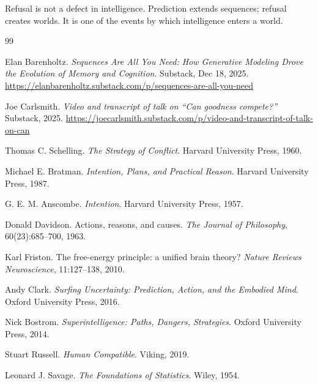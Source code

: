 \documentclass[11pt]{article}
\begin{document}
Refusal is not a defect in intelligence. Prediction extends sequences; refusal
creates worlds. It is one of the events by which intelligence enters a world.


\newpage
\begin{thebibliography}{99}

Elan Barenholtz.
\newblock \emph{Sequences Are All You Need: How Generative Modeling Drove the
Evolution of Memory and Cognition}.
\newblock Substack, Dec 18, 2025.
\newblock \url{https://elanbarenholtz.substack.com/p/sequences-are-all-you-need}

Joe Carlsmith.
\newblock \emph{Video and transcript of talk on ``Can goodness compete?''}
\newblock Substack, 2025.
\newblock \url{https://joecarlsmith.substack.com/p/video-and-transcript-of-talk-on-can}

Thomas C. Schelling.
\newblock \emph{The Strategy of Conflict}.
\newblock Harvard University Press, 1960.

Michael E. Bratman.
\newblock \emph{Intention, Plans, and Practical Reason}.
\newblock Harvard University Press, 1987.

G. E. M. Anscombe.
\newblock \emph{Intention}.
\newblock Harvard University Press, 1957.

Donald Davidson.
\newblock Actions, reasons, and causes.
\newblock \emph{The Journal of Philosophy}, 60(23):685--700, 1963.

Karl Friston.
\newblock The free-energy principle: a unified brain theory?
\newblock \emph{Nature Reviews Neuroscience}, 11:127--138, 2010.

Andy Clark.
\newblock \emph{Surfing Uncertainty: Prediction, Action, and the Embodied
Mind}.
\newblock Oxford University Press, 2016.

Nick Bostrom.
\newblock \emph{Superintelligence: Paths, Dangers, Strategies}.
\newblock Oxford University Press, 2014.

Stuart Russell.
\newblock \emph{Human Compatible}.
\newblock Viking, 2019.

Leonard J. Savage.
\newblock \emph{The Foundations of Statistics}.
\newblock Wiley, 1954.


\end{thebibliography}
\end{document}
